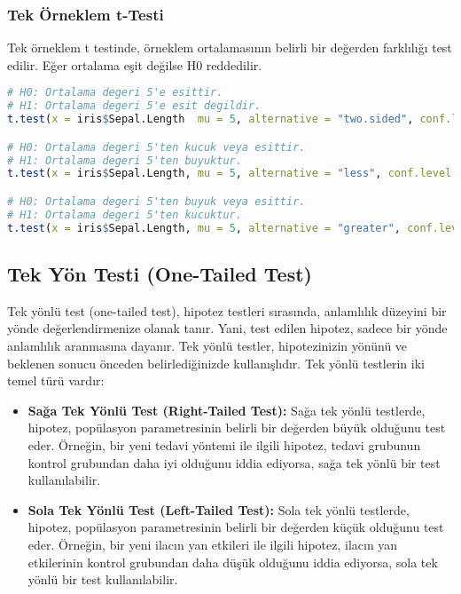 \subsubsection{Tek Örneklem t-Testi}
Tek örneklem t testinde, örneklem ortalamasının belirli bir değerden farklılığı test edilir. Eğer ortalama eşit değilse H0 reddedilir.

\begin{lstlisting}[language=R]
# H0: Ortalama degeri 5'e esittir.
# H1: Ortalama degeri 5'e esit degildir.
t.test(x = iris$Sepal.Length  mu = 5, alternative = "two.sided", conf.level = 0.95)

# H0: Ortalama degeri 5'ten kucuk veya esittir.
# H1: Ortalama degeri 5'ten buyuktur.
t.test(x = iris$Sepal.Length, mu = 5, alternative = "less", conf.level = 0.95)

# H0: Ortalama degeri 5'ten buyuk veya esittir.
# H1: Ortalama degeri 5'ten kucuktur.
t.test(x = iris$Sepal.Length, mu = 5, alternative = "greater", conf.level = 0.95)
\end{lstlisting}

\subsection{Tek Yön Testi (One-Tailed Test)}
Tek yönlü test (one-tailed test), hipotez testleri sırasında, anlamlılık düzeyini bir yönde değerlendirmenize olanak tanır. Yani, test edilen hipotez, sadece bir yönde anlamlılık aranmasına dayanır. Tek yönlü testler, hipotezinizin yönünü ve beklenen sonucu önceden belirlediğinizde kullanışlıdır. Tek yönlü testlerin iki temel türü vardır:

\begin{itemize}
    \item \textbf{Sağa Tek Yönlü Test (Right-Tailed Test):} Sağa tek yönlü testlerde, hipotez, popülasyon parametresinin belirli bir değerden büyük olduğunu test eder. Örneğin, bir yeni tedavi yöntemi ile ilgili hipotez, tedavi grubunun kontrol grubundan daha iyi olduğunu iddia ediyorsa, sağa tek yönlü bir test kullanılabilir.
    \item \textbf{Sola Tek Yönlü Test (Left-Tailed Test):} Sola tek yönlü testlerde, hipotez, popülasyon parametresinin belirli bir değerden küçük olduğunu test eder. Örneğin, bir yeni ilacın yan etkileri ile ilgili hipotez, ilacın yan etkilerinin kontrol grubundan daha düşük olduğunu iddia ediyorsa, sola tek yönlü bir test kullanılabilir.
\end{itemize}

